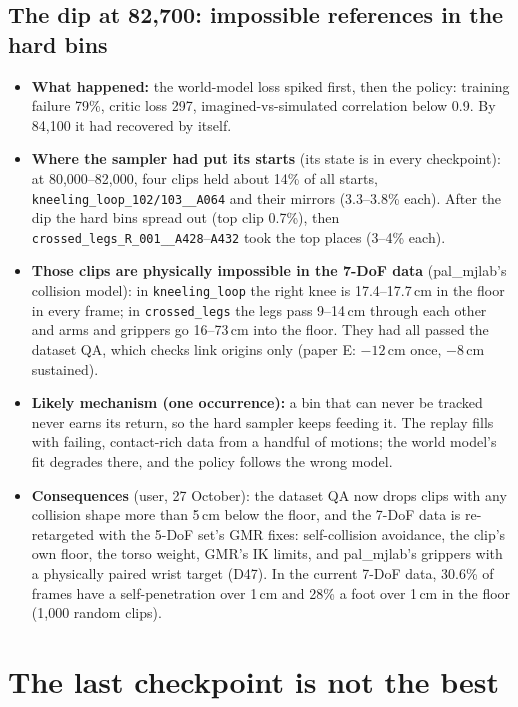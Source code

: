 \documentclass[10pt]{article}
\begin{document}
\subsection*{The dip at 82,700: impossible references in the hard bins}

\begin{itemize}
  \item \textbf{What happened:} the world-model loss spiked first, then the policy: training failure 79\%,
  critic loss 297, imagined-vs-simulated correlation below 0.9. By 84,100 it had recovered by itself.
  \item \textbf{Where the sampler had put its starts} (its state is in every checkpoint): at 80,000--82,000,
  four clips held about 14\% of all starts, \texttt{kneeling\_loop\_102/103\_\_A064} and their mirrors
  (3.3--3.8\% each). After the dip the hard bins spread out (top clip 0.7\%), then
  \texttt{crossed\_legs\_R\_001\_\_A428}--\texttt{A432} took the top places (3--4\% each).
  \item \textbf{Those clips are physically impossible in the 7-DoF data} (pal\_mjlab's collision model): in
  \texttt{kneeling\_loop} the right knee is 17.4--17.7\,cm in the floor in every frame; in
  \texttt{crossed\_legs} the legs pass 9--14\,cm through each other and arms and grippers go 16--73\,cm into
  the floor. They had all passed the dataset QA, which checks link origins only (paper E: $-12$\,cm once,
  $-8$\,cm sustained).
  \item \textbf{Likely mechanism (one occurrence):} a bin that can never be tracked never earns its return,
  so the hard sampler keeps feeding it. The replay fills with failing, contact-rich data from a handful of
  motions; the world model's fit degrades there, and the policy follows the wrong model.
  \item \textbf{Consequences} (user, 27 October): the dataset QA now drops clips with any collision shape
  more than 5\,cm below the floor, and the 7-DoF data is re-retargeted with the 5-DoF set's GMR fixes:
  self-collision avoidance, the clip's own floor, the torso weight, GMR's IK limits, and pal\_mjlab's
  grippers with a physically paired wrist target (D47). In the current 7-DoF data, 30.6\% of frames have a
  self-penetration over 1\,cm and 28\% a foot over 1\,cm in the floor (1,000 random clips).
\end{itemize}

\section{The last checkpoint is not the best}
\end{document}
